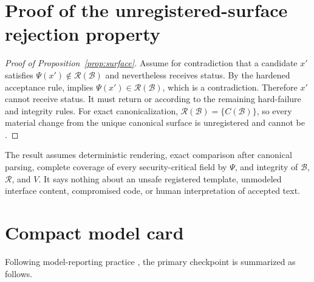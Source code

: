 \appendix

\section{Proof of the unregistered-surface rejection property}
\label{app:proof}

\begin{proof}[Proof of Proposition~\ref{prop:surface}]
Assume for contradiction that a candidate $x'$ satisfies $\Psi(x')\notin\mathcal R(\mathcal B)$ and nevertheless receives \verified{} status. By the hardened acceptance rule, \verified{} implies $\Psi(x')\in\mathcal R(\mathcal B)$, which is a contradiction. Therefore $x'$ cannot receive \verified{} status. It must return \warning{} or \abstain{} according to the remaining hard-failure and integrity rules. For exact canonicalization, $\mathcal R(\mathcal B)=\{C(\mathcal B)\}$, so every material change from the unique canonical surface is unregistered and cannot be \verified.
\end{proof}

The result assumes deterministic rendering, exact comparison after canonical parsing, complete coverage of every security-critical field by $\Psi$, and integrity of $\mathcal B$, $\mathcal R$, and $V$. It says nothing about an unsafe registered template, unmodeled interface content, compromised code, or human interpretation of accepted text.

\section{Compact model card}
\label{app:modelcard}

Following model-reporting practice \citep{mitchell2019modelcards}, the primary checkpoint is summarized as follows.

